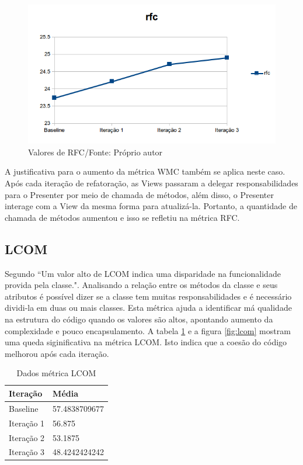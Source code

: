\begin{figure}[!h]
	\centering
	\includegraphics{img/rfc.png}
	\caption{Valores de RFC/Fonte: Próprio autor}
	\label{fig:rfc}
\end{figure}

A justificativa para o aumento da métrica WMC também se aplica neste caso.
Após cada iteração de refatoração, as Views passaram a delegar
responsabilidades para o Presenter por meio de chamada de métodos, além disso, o Presenter interage com a
View da mesma forma para atualizá-la. Portanto, a quantidade de chamada de
métodos aumentou e isso se refletiu na métrica RFC.

\subsection{LCOM}

Segundo  ``Um valor alto de LCOM indica uma disparidade na
funcionalidade provida pela classe.". Analisando a relação entre os métodos da
classe e seus atributos é possível dizer se a classe tem muitas
responsabilidades e é necessário dividi-la em duas ou mais classes. Esta métrica
ajuda a identificar má qualidade na estrutura do código quando os valores são
altos, apontando aumento da complexidade e pouco encapsulamento. A tabela
\ref{tab:lcom} e a figura \ref{fig:lcom} mostram uma queda siginificativa na
métrica LCOM. Isto indica que a coesão do código melhorou após cada iteração.

\begin{table}[!h]
	\centering
	    \caption{Dados métrica LCOM}
    \begin{tabular}{ | l | l | }
    \hline
    Iteração & Média 			\\ \hline
    Baseline & 57.4838709677   	\\ \hline
    Iteração 1 & 56.875			\\ \hline
	Iteração 2 & 53.1875		\\ \hline
	Iteração 3 & 48.4242424242	\\ \hline
    \end{tabular}
    \label{tab:lcom}
\end{table}

